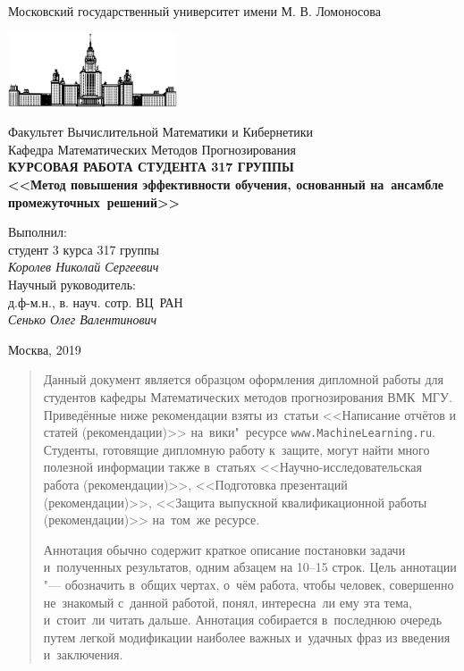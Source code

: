 \documentclass[12pt, fleqn]{article}
\begin{document}
\begin{titlepage}
\begin{center}
    Московский государственный университет имени М. В. Ломоносова

    \bigskip
    \includegraphics[width=50mm]{msu.eps}

    \bigskip
    Факультет Вычислительной Математики и Кибернетики\\
    Кафедра Математических Методов Прогнозирования\\[10mm]

    \textsf{\large\bfseries
        КУРСОВАЯ РАБОТА СТУДЕНТА 317 ГРУППЫ\\[10mm]
        <<Метод повышения эффективности обучения, основанный на~ансамбле промежуточных~решений>>
    }\\[10mm]

    \begin{flushright}
        \parbox{0.5\textwidth}{
            Выполнил:\\
            студент 3 курса 317 группы\\
            \emph{Королев Николай Сергеевич}\\[5mm]
            Научный руководитель:\\
            д.ф-м.н., в. науч. сотр. ВЦ~РАН\\
            \emph{Сенько Олег Валентинович}
        }
    \end{flushright}

    \vspace{\fill}
    Москва, 2019
\end{center}
\end{titlepage}

\newpage
\renewcommand{\contentsname}{Содержание}
\tableofcontents

\newpage
\begin{abstract}
    Данный документ является образцом оформления дипломной работы для студентов кафедры 
    Математических методов прогнозирования ВМК~МГУ. 
    Приведённые ниже рекомендации взяты из~статьи
    <<Написание отчётов и статей (рекомендации)>>
    на~вики"~ресурсе \texttt{www.MachineLearning.ru}.
    Студенты, готовящие дипломную работу к~защите, 
    могут найти много полезной информации также в~статьях 
    <<Научно-исследовательская работа (рекомендации)>>,
    <<Подготовка презентаций (рекомендации)>>,
    <<Защита выпускной квалификационной работы (рекомендации)>>
    на~том~же ресурсе. 

    Аннотация обычно содержит 
    краткое описание постановки задачи и~полученных результатов,
    одним абзацем на 10--15 строк.
    Цель аннотации "--- обозначить в~общих чертах, о~чём работа,
    чтобы человек, совершенно не~знакомый с~данной работой,
    понял, интересна~ли ему эта тема, и~стоит~ли читать дальше.
    Аннотация собирается в~последнюю очередь
    путем легкой модификации наиболее важных и~удачных фраз из введения и~заключения.
\end{abstract}
\end{document}
